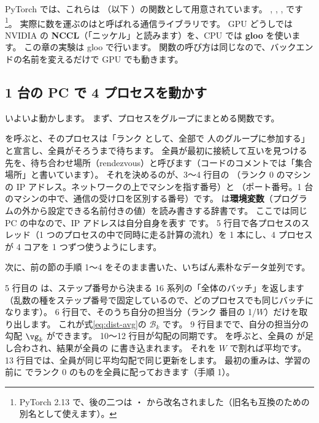PyTorch では、これらは （以下 ）の関数として用意されています。
, , ,  です\footnote{PyTorch 2.13 で、後の二つは ・ から改名されました（旧名も互換のための別名として使えます）。}。
実際に数を運ぶのはと呼ばれる通信ライブラリです。
GPU どうしでは NVIDIA の \textbf{NCCL}（「ニッケル」と読みます）を、CPU では \textbf{gloo} を使います。
この章の実験は gloo で行います。
関数の呼び方は同じなので、バックエンドの名前を変えるだけで GPU でも動きます。

\subsection*{1 台の PC で 4 プロセスを動かす}

いよいよ動かします。
まず、プロセスをグループにまとめる関数です。


 を呼ぶと、そのプロセスは「ランク  として、全部で  人のグループに参加する」と宣言し、全員がそろうまで待ちます。
全員が最初に接続して互いを見つける先を、待ち合わせ場所（rendezvous）と呼びます（コードのコメントでは「集合場所」と書いています）。
それを決めるのが、3〜4 行目の （ランク 0 のマシンの IP アドレス。ネットワークの上でマシンを指す番号）と （ポート番号。1 台のマシンの中で、通信の受け口を区別する番号）です。
 は\textbf{環境変数}（プログラムの外から設定できる名前付きの値）を読み書きする辞書です。
ここでは同じ PC の中なので、IP アドレスは自分自身を表す  です。
5 行目で各プロセスのスレッド（1 つのプロセスの中で同時に走る計算の流れ）を 1 本にし、4 プロセスが 4 コアを 1 つずつ使うようにします。

次に、前の節の手順 1〜4 をそのまま書いた、いちばん素朴なデータ並列です。


5 行目の  は、ステップ番号から決まる 16 系列の「全体のバッチ」を返します（乱数の種をステップ番号で固定しているので、どのプロセスでも同じバッチになります）。
6 行目で、そのうち自分の担当分（ランク  番目の 1/$W$）だけを取り出します。
これが式\eqref{eq:dist-avg}の $\mathcal{B}_k$ です。
9 行目までで、自分の担当分の勾配 $\vg_k$ ができます。
10〜12 行目が勾配の同期です。
 を呼ぶと、全員の  が足し合わされ、結果が全員の  に書き込まれます。
それを $W$ で割れば平均です。
13 行目では、全員が同じ平均勾配で同じ更新をします。
最初の重みは、学習の前に  でランク 0 のものを全員に配っておきます（手順 1）。

